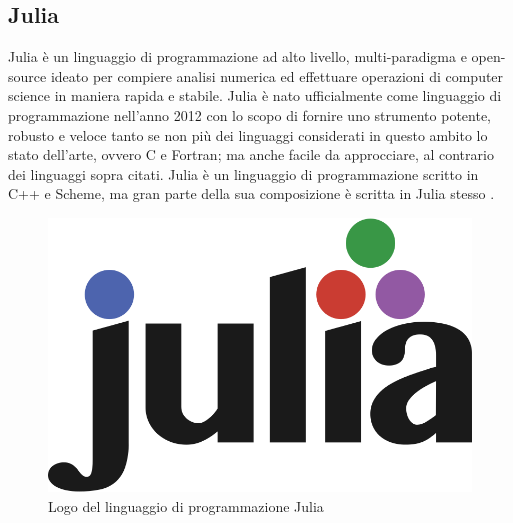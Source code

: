 \subsection{Julia}
Julia è un linguaggio di programmazione ad alto livello, 
multi-paradigma e open-source ideato per compiere analisi 
numerica ed effettuare operazioni di computer science in 
maniera rapida e stabile. Julia è nato ufficialmente come 
linguaggio di programmazione nell’anno 2012 con lo scopo di 
fornire uno strumento potente, robusto e veloce tanto se non 
più dei linguaggi considerati in questo ambito lo stato 
dell’arte, ovvero C e Fortran;  ma anche facile da approcciare, 
al contrario dei linguaggi sopra citati. Julia è un linguaggio 
di programmazione scritto in C++ e Scheme, ma gran parte della 
sua composizione è scritta in Julia stesso 
\cite{wiki:Julia_(programming_language)}.

\begin{figure}[h]
    \includegraphics[width=\linewidth]{img/Julia_Programming_Language_Logo.svg.png}
    \caption{Logo del linguaggio di programmazione Julia}
    \label{fig:Julia_logo}
\end{figure}

